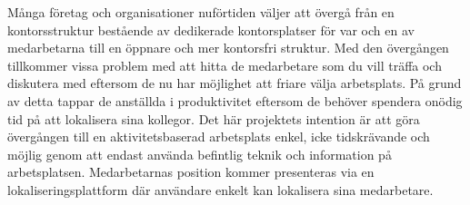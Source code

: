 \documentclass[swedish, a4paper,12pt]{article}
\begin{document}
\begin{sammanfattning}
%
%
Många företag och organisationer nuförtiden väljer att övergå från en kontorsstruktur bestående av dedikerade kontorsplatser för var och en av medarbetarna till en öppnare och mer kontorsfri struktur. Med den övergången tillkommer vissa problem med att hitta de medarbetare som du vill träffa och diskutera med eftersom de nu har möjlighet att friare välja arbetsplats. På grund av detta tappar de anställda i produktivitet eftersom de behöver spendera onödig tid på att lokalisera sina kollegor. Det här projektets intention är att göra övergången till en aktivitetsbaserad arbetsplats enkel, icke tidskrävande och möjlig genom att endast använda befintlig teknik och information på arbetsplatsen. Medarbetarnas position kommer presenteras via en lokaliseringsplattform där användare enkelt kan lokalisera sina medarbetare.

\end{sammanfattning}

\tableofcontents

\end{document}
